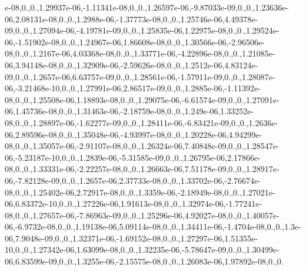 {e-\/08,0.,0.,1.\-29937e-\/06,-\/1.\-11341e-\/08,0.,0.,1.\-26597e-\/06,-\/9.\-87033e-\/09,0.,0.,1.\-23636e-\/06,2.\-08131e-\/08,0.,0.,1.\-2988e-\/06,-\/1.\-37773e-\/08,0.,0.,1.\-25746e-\/06,4.\-49378e-\/09,0.,0.,1.\-27094e-\/06,-\/4.\-19781e-\/09,0.,0.,1.\-25835e-\/06,1.\-22975e-\/08,0.,0.,1.\-29524e-\/06,-\/1.\-51902e-\/08,0.,0.,1.\-24967e-\/06,1.\-86608e-\/08,0.,0.,1.\-30566e-\/06,-\/2.\-96506e-\/08,0.,0.,1.\-2167e-\/06,4.\-03368e-\/08,0.,0.,1.\-33771e-\/06,-\/4.\-22896e-\/08,0.,0.,1.\-21085e-\/06,3.\-94148e-\/08,0.,0.,1.\-32909e-\/06,-\/2.\-59626e-\/08,0.,0.,1.\-2512e-\/06,4.\-83124e-\/09,0.,0.,1.\-2657e-\/06,6.\-63757e-\/09,0.,0.,1.\-28561e-\/06,-\/1.\-57911e-\/09,0.,0.,1.\-28087e-\/06,-\/3.\-21468e-\/10,0.,0.,1.\-27991e-\/06,2.\-86517e-\/09,0.,0.,1.\-2885e-\/06,-\/1.\-11392e-\/08,0.,0.,1.\-25508e-\/06,1.\-18893e-\/08,0.,0.,1.\-29075e-\/06,-\/6.\-61574e-\/09,0.,0.,1.\-27091e-\/06,1.\-45736e-\/08,0.,0.,1.\-31463e-\/06,-\/2.\-18759e-\/08,0.,0.,1.\-249e-\/06,1.\-33252e-\/08,0.,0.,1.\-28897e-\/06,-\/1.\-62277e-\/09,0.,0.,1.\-28411e-\/06,-\/6.\-83421e-\/09,0.,0.,1.\-2636e-\/06,2.\-89596e-\/08,0.,0.,1.\-35048e-\/06,-\/4.\-93997e-\/08,0.,0.,1.\-20228e-\/06,4.\-94299e-\/08,0.,0.,1.\-35057e-\/06,-\/2.\-91107e-\/08,0.,0.,1.\-26324e-\/06,7.\-40848e-\/09,0.,0.,1.\-28547e-\/06,-\/5.\-23187e-\/10,0.,0.,1.\-2839e-\/06,-\/5.\-31585e-\/09,0.,0.,1.\-26795e-\/06,2.\-17866e-\/08,0.,0.,1.\-33331e-\/06,-\/2.\-22257e-\/08,0.,0.,1.\-26663e-\/06,7.\-51178e-\/09,0.,0.,1.\-28917e-\/06,-\/7.\-82128e-\/09,0.,0.,1.\-2657e-\/06,2.\-37733e-\/08,0.,0.,1.\-33702e-\/06,-\/2.\-76674e-\/08,0.,0.,1.\-25402e-\/06,2.\-72917e-\/08,0.,0.,1.\-3359e-\/06,-\/2.\-18949e-\/08,0.,0.,1.\-27021e-\/06,6.\-83372e-\/10,0.,0.,1.\-27226e-\/06,1.\-91613e-\/08,0.,0.,1.\-32974e-\/06,-\/1.\-77241e-\/08,0.,0.,1.\-27657e-\/06,-\/7.\-86963e-\/09,0.,0.,1.\-25296e-\/06,4.\-92027e-\/08,0.,0.,1.\-40057e-\/06,-\/6.\-9732e-\/08,0.,0.,1.\-19138e-\/06,5.\-09114e-\/08,0.,0.,1.\-34411e-\/06,-\/1.\-4704e-\/08,0.,0.,1.\-3e-\/06,7.\-9048e-\/09,0.,0.,1.\-32371e-\/06,-\/1.\-69152e-\/08,0.,0.,1.\-27297e-\/06,1.\-51355e-\/10,0.,0.,1.\-27342e-\/06,1.\-63099e-\/08,0.,0.,1.\-32235e-\/06,-\/5.\-78647e-\/09,0.,0.,1.\-30499e-\/06,6.\-83599e-\/09,0.,0.,1.\-3255e-\/06,-\/2.\-15575e-\/08,0.,0.,1.\-26083e-\/06,1.\-97892e-\/08,0.,0.}
